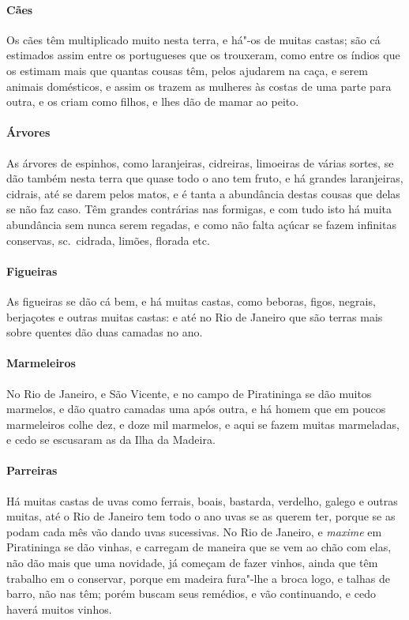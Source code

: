 \paragraph{Cães} Os cães têm multiplicado muito nesta terra, e há"-os de
muitas castas; são cá estimados assim entre os portugueses que os
trouxeram, como entre os índios que os estimam mais que quantas cousas
têm, pelos ajudarem na caça, e serem animais domésticos, e assim os
trazem as mulheres às costas de uma parte para outra, e os criam como
filhos, e lhes dão de mamar ao peito. 

\paragraph{Árvores} As árvores de espinhos, como laranjeiras, cidreiras,
limoeiras de várias sortes, se dão também nesta terra que quase todo o
ano tem fruto, e há grandes laranjeiras, cidrais, até se darem pelos
matos, e é tanta a abundância destas cousas que delas se não faz caso.
Têm grandes contrárias nas formigas, e com tudo isto há muita
abundância sem nunca serem regadas, e como não falta açúcar se fazem
infinitas conservas, sc.~cidrada, limões, florada etc.

\paragraph{Figueiras} As figueiras se dão cá bem, e há muitas castas,
como beboras, figos, negrais, berjaçotes e outras muitas castas: e até
no Rio de Janeiro que são terras mais sobre quentes dão duas camadas no ano.

\paragraph{Marmeleiros} No Rio de Janeiro, e São Vicente, e no campo de
Piratininga se dão muitos marmelos, e dão quatro camadas uma após
outra, e há homem que em poucos marmeleiros colhe dez, e doze mil
marmelos, e aqui se fazem muitas marmeladas, e cedo se escusaram as da
Ilha da Madeira.

\paragraph{Parreiras} Há muitas castas de uvas como ferrais, boais,
bastarda, verdelho, galego e outras muitas, até o Rio de Janeiro tem
todo o ano uvas se as querem ter, porque se as podam cada mês vão dando
uvas sucessivas. No Rio de Janeiro, e \textit{maxime} em Piratininga se dão
vinhas, e carregam de maneira que se vem ao chão com elas, não dão mais
que uma novidade, já começam de fazer vinhos, ainda que têm trabalho em
o conservar, porque em madeira fura"-lhe a broca logo, e talhas de
barro, não nas têm; porém buscam seus remédios, e vão continuando, e
cedo haverá muitos vinhos.

